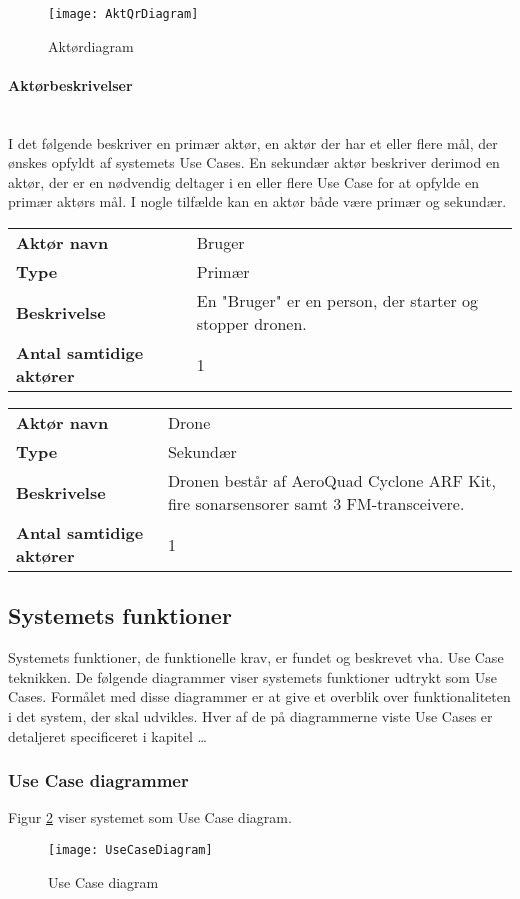 \documentclass[Main]{subfiles}
\begin{document}
\begin{figure}[hbtp]
\centering
\texttt{[image: AktQrDiagram]}
\caption{Aktørdiagram}
\label{Fig:Aktor-oversigt}
\end{figure}


\paragraph{Aktørbeskrivelser}\mbox{} \\%
I det følgende beskriver en primær aktør, en aktør der har et eller flere mål, der ønskes opfyldt af systemets Use Cases. 
En sekundær aktør beskriver derimod en aktør, der er en nødvendig deltager i en eller flere Use Case for at opfylde en primær aktørs mål. 
I nogle tilfælde kan en  aktør både være primær og sekundær.

\begin{longtable}{p{}|p{}}
\hline
\textbf{Aktør navn}  				& Bruger \\
\textbf{Type} 						& Primær \\
\textbf{Beskrivelse} 				& En "Bruger" er en person, der starter og stopper dronen. \\
\textbf{Antal samtidige aktører} 	& 1 \\
\hline
\end{longtable}

\begin{longtable}{p{}|p{}}
\hline
\textbf{Aktør navn}  				& Drone \\
\textbf{Type} 						& Sekundær \\
\textbf{Beskrivelse} 				& Dronen består af AeroQuad Cyclone ARF Kit, fire sonarsensorer samt 3 FM-transceivere. \\
\textbf{Antal samtidige aktører} 	& 1 \\
\hline
\end{longtable}

\newpage
\subsection{Systemets funktioner}
Systemets funktioner, de funktionelle krav, er fundet og beskrevet vha. Use Case teknikken. 
De følgende diagrammer viser systemets funktioner udtrykt som Use Cases. 
Formålet med disse diagrammer er at give et overblik over funktionaliteten i det system, der skal udvikles. 
Hver af de på diagrammerne viste Use Cases er detaljeret specificeret i kapitel \dots %



\subsubsection{Use Case diagrammer}
Figur \ref{Fig:UC-Diagram} viser systemet som Use Case diagram.

\begin{figure}[hbtp]
\centering
\texttt{[image: UseCaseDiagram]}
\caption{Use Case diagram}
\label{Fig:UC-Diagram}
\end{figure}
\end{document}
